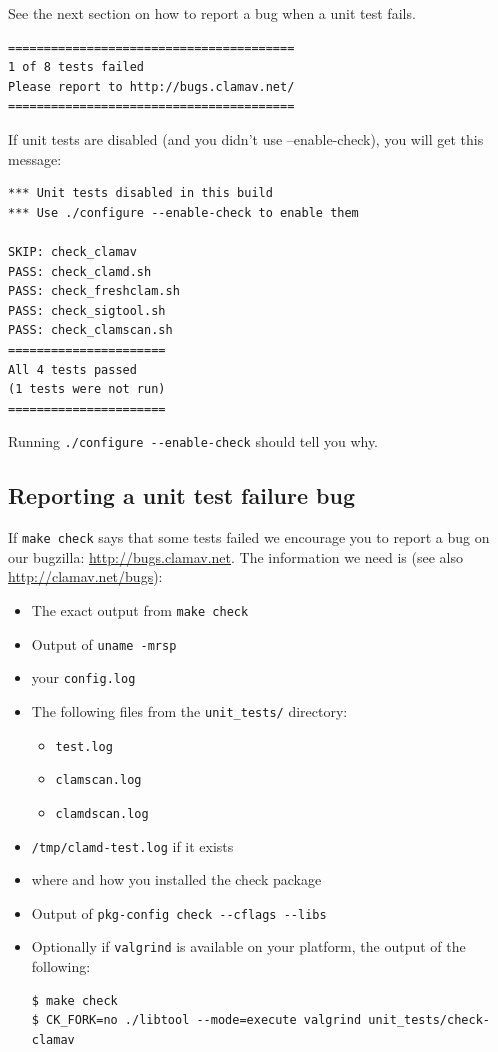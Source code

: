 \documentclass[a4paper,titlepage,12pt]{article}
\begin{document}
	See the next section on how to report a bug when a unit test fails.
	\begin{verbatim}
========================================
1 of 8 tests failed
Please report to http://bugs.clamav.net/
========================================
	\end{verbatim}
	If unit tests are disabled (and you didn't use --enable-check), you will get this message:
	\begin{verbatim}
*** Unit tests disabled in this build
*** Use ./configure --enable-check to enable them

SKIP: check_clamav
PASS: check_clamd.sh
PASS: check_freshclam.sh
PASS: check_sigtool.sh
PASS: check_clamscan.sh
======================
All 4 tests passed
(1 tests were not run)
======================
	\end{verbatim}
	Running \verb+./configure --enable-check+ should tell you why.

    \subsection{Reporting a unit test failure bug}
	If \verb+make check+ says that some tests failed we encourage you to report a bug on our bugzilla: \url{http://bugs.clamav.net}.
	The information we need is (see also \url{http://clamav.net/bugs}):
	\begin{itemize}
	 \item The exact output from \verb+make check+	 
	 \item Output of \verb+uname -mrsp+ 
	 \item your \verb+config.log+	 
	 \item The following files from the \verb+unit_tests/+ directory:
		\begin{itemize}
			\item \verb+test.log+
	 		\item \verb+clamscan.log+
			\item \verb+clamdscan.log+
		\end{itemize}
	 \item \verb+/tmp/clamd-test.log+ if it exists
         \item where and how you installed the check package
	 \item Output of \verb+pkg-config check --cflags --libs+
	 \item Optionally if \verb+valgrind+ is available on your platform, the output of the following:
	 \begin{verbatim}
$ make check
$ CK_FORK=no ./libtool --mode=execute valgrind unit_tests/check-clamav
	 \end{verbatim}	
	\end{itemize}
\end{document}
